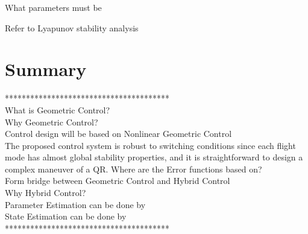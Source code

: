 What parameters must be 

Refer to Lyapunov stability analysis \cite{Bullo2005}

\section{Summary}

***************************************\\
What is Geometric Control?\\
Why Geometric Control?\\
Control design will be based on Nonlinear Geometric Control\\

The proposed control system is robust to switching conditions since each flight mode has almost global stability properties, and it is straightforward to design a complex maneuver of a QR. \cite{Lee2010c}
Where are the Error functions based on?\\

Form bridge between Geometric Control and Hybrid Control\\
Why Hybrid Control?\\

Parameter Estimation can be done by\\
State Estimation can be done by\\

***************************************\\